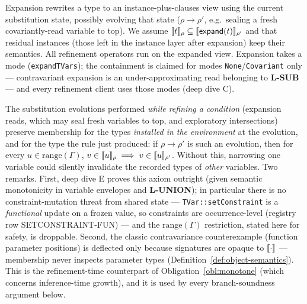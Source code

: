 \documentclass[11pt]{article}
\newcommand{\Env}{\Gamma}
\begin{document}
\begin{axiom}
\label{ax:expansion}
Expansion rewrites a type to an instance-plus-clauses view using the current
substitution state, possibly evolving that state
($\rho \rightarrow \rho'$, e.g.\ sealing a fresh covariantly-read variable to
top). We assume
$\llbracket t \rrbracket_\rho \subseteq \llbracket \mathsf{expand}(t) \rrbracket_{\rho'}$ and that residual
instances (those left in the instance layer after expansion) keep their
semantics. All refinement operators run on the expanded view. Expansion
takes a mode (\texttt{expandTVars}); the containment is claimed for modes
\texttt{None}/\texttt{Covariant} only — contravariant expansion is an
under-approximating read belonging to \textbf{L-SUB} — and every
refinement client uses those modes (deep dive C).
\end{axiom}

\begin{axiom}
\label{ax:mono}
The substitution evolutions performed \emph{while refining a condition}
(expansion reads, which may seal fresh variables to top, and exploratory
intersections) preserve membership for the types \emph{installed in the
environment} at the evolution, and for the type the rule just produced: if
$\rho \to \rho'$ is such an evolution, then for every
$u \in \mathrm{range}(\Env)$,
$v \in \llbracket u \rrbracket_\rho \implies v \in \llbracket u \rrbracket_{\rho'}$.
Without this, narrowing one variable could silently invalidate the recorded
types of \emph{other} variables. Two remarks. First, deep dive E proves
this axiom outright (given semantic monotonicity in variable envelopes and
\textbf{L-UNION}); in particular there is no constraint-mutation threat
from shared state — \texttt{TVar::setConstraint} is a \emph{functional}
update on a frozen value, so constraints are occurrence-level (registry
row SETCONSTRAINT-FUN) — and the
$\mathrm{range}(\Env)$ restriction, stated here for safety, is
droppable. Second, the classic
contravariance counterexample (function parameter positions) is deflected
only because signatures are opaque to $\llbracket \cdot \rrbracket$ — membership never
inspects parameter types (Definition~\ref{def:object-semantics}). This is
the refinement-time counterpart of Obligation~\ref{obl:monotone} (which
concerns inference-time growth), and it is used by every branch-soundness
argument below.
\end{axiom}
\end{document}
